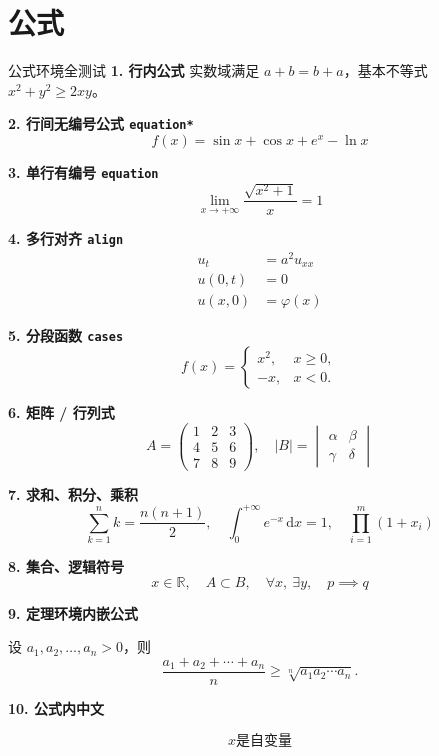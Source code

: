 \section{公式}
\begin{frame}[allowframebreaks]{公式环境全测试}
\textbf{1. 行内公式}
实数域满足 $a+b=b+a$，基本不等式 $x^2+y^2 \ge 2xy$。

\vspace{1em}
\textbf{2. 行间无编号公式 \texttt{equation*}}
\begin{equation*}
f(x) = \sin x + \cos x + e^x - \ln x
\end{equation*}

\vspace{1em}
\textbf{3. 单行有编号 \texttt{equation}}
\begin{equation}
\lim_{x\to+\infty} \frac{\sqrt{x^2+1}}{x} = 1
\end{equation}

\vspace{1em}
\textbf{4. 多行对齐 \texttt{align}}
\begin{align}
u_t &= a^2 u_{xx} \\
u(0,t) &= 0 \\
u(x,0) &= \varphi(x)
\end{align}

\vspace{1em}
\textbf{5. 分段函数 \texttt{cases}}
\[
f(x) =
\begin{cases}
x^2, & x\ge 0, \\
-x,  & x<0.
\end{cases}
\]

\vspace{1em}
\textbf{6. 矩阵 / 行列式}
\[
A=
\begin{pmatrix}
1 & 2 & 3 \\
4 & 5 & 6 \\
7 & 8 & 9
\end{pmatrix},\quad
|B|=
\begin{vmatrix}
\alpha & \beta \\
\gamma & \delta
\end{vmatrix}
\]

\vspace{1em}
\textbf{7. 求和、积分、乘积}
\[
\sum_{k=1}^n k = \dfrac{n(n+1)}{2},\quad
\int_0^{+\infty} e^{-x}\,\mathrm{d}x = 1,\quad
\prod_{i=1}^m (1+x_i)
\]

\vspace{1em}
\textbf{8. 集合、逻辑符号}
\[
x\in \mathbb{R},\quad A\subset B,\quad
\forall x,\ \exists y,\quad
p \implies q
\]

\vspace{1em}
\textbf{9. 定理环境内嵌公式}

\begin{theorem}[均值不等式]
设 $a_1,a_2,\dots,a_n>0$，则
\[
\frac{a_1+a_2+\cdots+a_n}{n}
\ge \sqrt[n]{a_1a_2\cdots a_n}.
\]
\end{theorem}

\textbf{10. 公式内中文}

$$x是自变量$$

\end{frame}




